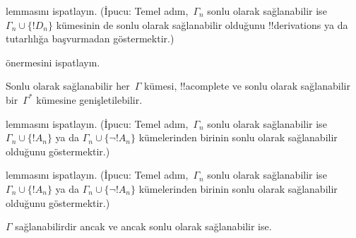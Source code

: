 \documentclass[../../../include/open-logic-section]{subfiles}
\begin{document}
\begin{prob}
 lemmasını ispatlayın. (İpucu:
Temel adım,~$\Gamma_n$ sonlu olarak sağlanabilir ise
$\Gamma_n\cup\{!D_n\}$ kümesinin de sonlu olarak sağlanabilir olduğunu
!!{derivation}s ya da tutarlılığa başvurmadan göstermektir.)
\end{prob}
\tagendprob


\begin{prob}
 önermesini ispatlayın.
\end{prob}
\tagendprob

\begin{lem}
 Sonlu olarak sağlanabilir her~$\Gamma$
kümesi, !!a{complete} ve sonlu olarak sağlanabilir bir~$\Gamma^*$
kümesine genişletilebilir.
\end{lem}

\begin{prob}
 lemmasını ispatlayın.
(İpucu: Temel adım,~$\Gamma_n$ sonlu olarak sağlanabilir ise
$\Gamma_n\cup\{!A_n\}$ ya da $\Gamma_n\cup\{\lnot !A_n\}$
kümelerinden birinin sonlu olarak sağlanabilir olduğunu göstermektir.)
\end{prob}
\tagendprob

\begin{prob}
 lemmasını ispatlayın.
(İpucu: Temel adım,~$\Gamma_n$ sonlu olarak sağlanabilir ise
$\Gamma_n\cup\{!A_n\}$ ya da $\Gamma_n\cup\{\lnot !A_n\}$
kümelerinden birinin sonlu olarak sağlanabilir olduğunu göstermektir.)
\end{prob}
\tagendprob

\begin{thm}[Tıkızlık]
 $\Gamma$ sağlanabilirdir ancak ve
ancak sonlu olarak sağlanabilir ise.
\end{thm}
\end{document}
